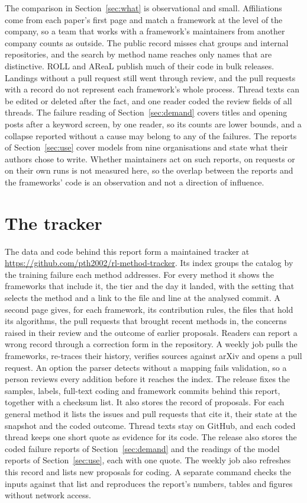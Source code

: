 \documentclass{article}
\begin{document}
The comparison in Section~\ref{sec:what} is observational and small. Affiliations come from each paper's first page and match a framework at the level of the company, so a team that works with a framework's maintainers from another company counts as outside. The public record misses chat groups and internal repositories, and the search by method name reaches only names that are distinctive. ROLL and AReaL publish much of their code in bulk releases. Landings without a pull request still went through review, and the pull requests with a record do not represent each framework's whole process. Thread texts can be edited or deleted after the fact, and one reader coded the review fields of all threads. The failure reading of Section~\ref{sec:demand} covers titles and opening posts after a keyword screen, by one reader, so its counts are lower bounds, and a collapse reported without a cause may belong to any of the failures. The reports of Section~\ref{sec:use} cover \NReports{} models from nine organisations and state what their authors chose to write. Whether maintainers act on such reports, on requests or on their own runs is not measured here, so the overlap between the reports and the frameworks' code is an observation and not a direction of influence.

\section{The tracker}
\label{sec:tracker}

The data and code behind this report form a maintained tracker at \url{https://github.com/pth2002/rl-method-tracker}. Its index groups the catalog by the training failure each method addresses. For every method it shows the frameworks that include it, the tier and the day it landed, with the setting that selects the method and a link to the file and line at the analysed commit. A second page gives, for each framework, its contribution rules, the files that hold its algorithms, the pull requests that brought recent methods in, the concerns raised in their review and the outcome of earlier proposals. Readers can report a wrong record through a correction form in the repository. A weekly job pulls the frameworks, re-traces their history, verifies sources against arXiv and opens a pull request. An option the parser detects without a mapping fails validation, so a person reviews every addition before it reaches the index. The release fixes the samples, labels, full-text coding and framework commits behind this report, together with a checksum list. It also stores the record of proposals. For each general method it lists the issues and pull requests that cite it, their state at the snapshot and the coded outcome. Thread texts stay on GitHub, and each coded thread keeps one short quote as evidence for its code. The release also stores the coded failure reports of Section~\ref{sec:demand} and the readings of the model reports of Section~\ref{sec:use}, each with one quote. The weekly job also refreshes this record and lists new proposals for coding. A separate command checks the inputs against that list and reproduces the report's numbers, tables and figures without network access.
\end{document}

